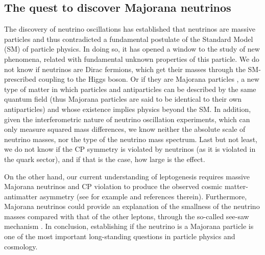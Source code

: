 \subsection{The quest to discover Majorana neutrinos}

The discovery of neutrino oscillations \cite{Super-Kamiokande:1998kpq,SNO:2001kpb,SNO:2002tuh} has established that neutrinos are massive
particles \cite{GonzalezGarcia:2002dz} and thus contradicted a fundamental postulate of the Standard Model (SM) of particle physics. In doing so, it has opened a window to the study of new phenomena, related with fundamental unknown properties of this particle. We do not know if neutrinos are Dirac fermions, which get their masses through the SM-prescribed coupling to the Higgs boson. Or if they are Majorana particles \cite{Majorana:1937}, a new type of matter in which particles and antiparticles can be described by the same quantum field (thus Majorana particles are said to be identical to their own antiparticles) and whose existence implies physics beyond the SM. In addition, given the interferometric nature of neutrino oscillation experiments, which can only measure squared mass differences, we know neither the absolute scale of neutrino masses, nor the type of the neutrino mass spectrum. Last but not least, we do not know if the CP symmetry is violated by neutrinos (as it is violated in the quark sector), and if that is the case, how large is the effect.

\indent

On the other hand, our current understanding of leptogenesis  \cite{Fukugita:1986hr, Fukugita:1998vn} requires
massive Majorana neutrinos and CP violation to produce the observed cosmic matter-antimatter asymmetry (see for example \cite{Sarkar:1998im} and references therein). Furthermore, Majorana neutrinos could provide an explanation of the smallness of the neutrino masses compared with that of the other leptons, through the so-called see-saw mechanism
\cite{GellMann:1980vs, Yanagida:1979as, Mohapatra:1979ia}. In conclusion, establishing if the neutrino is a Majorana particle is one of the most important long-standing questions in particle physics and cosmology.

